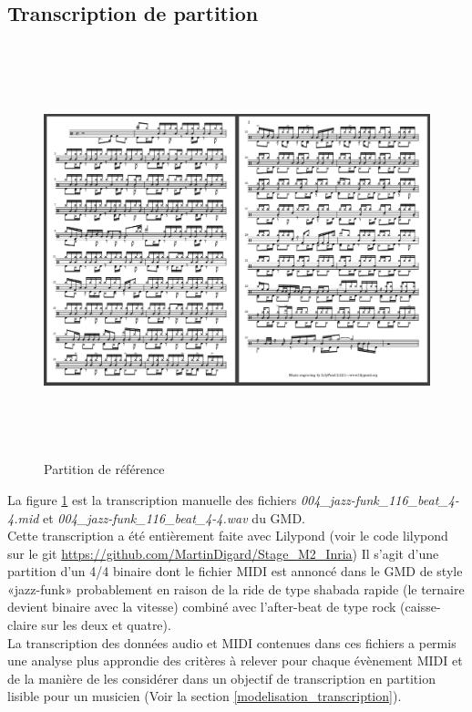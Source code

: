 \subsection*{Transcription de partition}
\label{partition_entiere}
\begin{figure}[h]
	\includegraphics[height=120mm, width=160mm]{z_images/4_experimentations/1_analyse_midi_audio/3_partition.png}
	\caption{Partition de référence}
	\label{partition_ref}
\end{figure}
La figure \ref{partition_ref} est la transcription manuelle des fichiers \textit{004\_jazz-funk\_116\_beat\_4-4.mid} et \textit{004\_jazz-funk\_116\_beat\_4-4.wav} du GMD.\\Cette transcription a été entièrement faite avec Lilypond (voir le code lilypond sur le git \url{https://github.com/MartinDigard/Stage_M2_Inria})
Il s’agit d’une partition d’un 4/4 binaire dont le fichier MIDI est annoncé dans le GMD de style «jazz-funk» probablement en raison de la ride de type shabada rapide (le ternaire devient binaire avec la vitesse) combiné avec l’after-beat de type rock (caisse-claire sur les deux et quatre).\\
La transcription des données audio et MIDI contenues dans ces fichiers a permis une analyse plus approndie des critères à relever pour chaque évènement MIDI et de la manière de les considérer dans un objectif de transcription en partition lisible pour un musicien (Voir la section \ref{modelisation_transcription}).
